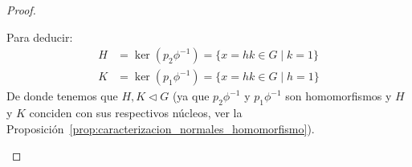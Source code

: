 \begin{teo}
\begin{proof}
\begin{description}
\begin{itemize}
\begin{figure}[H]
                        \end{figure}
                        Para deducir:
                        \begin{align*}
                            H &= \ker(p_2\phi^{-1}) = \{x=hk\in G \mid k = 1\} \\
                            K &= \ker(p_1\phi^{-1}) = \{x=hk\in G \mid h = 1\}
                        \end{align*}
                        De donde tenemos que $H,K\lhd G$ (ya que $p_2\phi^{-1}$ y $p_1\phi^{-1}$ son homomorfismos y $H$ y $K$ conciden con sus respectivos núcleos, ver la Proposición~\ref{prop:caracterizacion_normales_homomorfismo}).
                \end{itemize}


\end{description}
\end{proof}
\end{teo}
